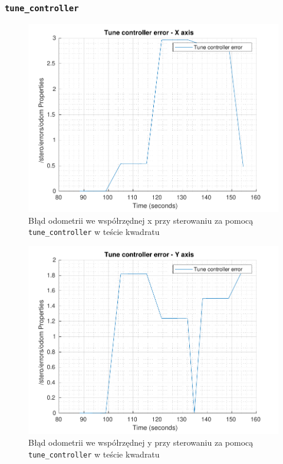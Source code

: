 \documentclass{mwrep}
\begin{document}
\subsubsection{\texttt{tune\_{}controller}}
\label{pro1_figures_square_tune}
\begin{figure}[H]
	\centering
	\includegraphics[scale=0.85]{./figures/pro1/square_tune/square_tune_x.pdf}
	\caption{Błąd odometrii we współrzędnej x przy sterowaniu za pomocą \texttt{tune\_{controller}} w teście kwadratu}
\end{figure}

\begin{figure}[H]
	\centering
	\includegraphics[scale=0.85]{./figures/pro1/square_tune/square_tune_y.pdf}
	\caption{Błąd odometrii we współrzędnej y przy sterowaniu za pomocą \texttt{tune\_{controller}} w teście kwadratu}
\end{figure}
\end{document}
